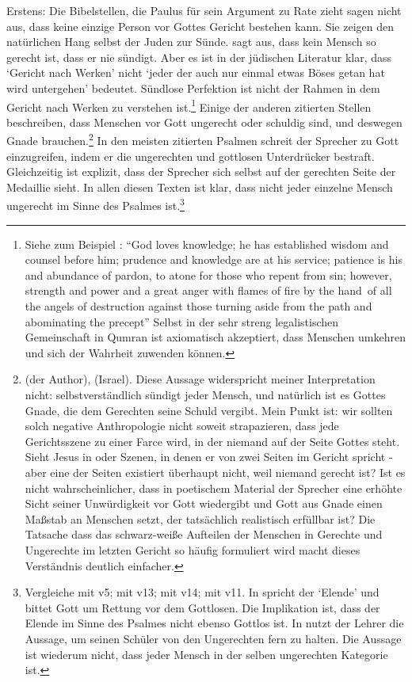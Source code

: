 Erstens: Die Bibelstellen, die Paulus für sein Argument zu Rate zieht sagen nicht aus, dass keine einzige Person vor Gottes Gericht bestehen kann.
Sie zeigen den natürlichen Hang selbst der Juden zur Sünde.
 sagt aus, dass kein Mensch so gerecht ist, dass er nie sündigt.
Aber es ist in der jüdischen Literatur klar, dass `Gericht nach Werken' nicht `jeder der auch nur einmal etwas Böses getan hat wird untergehen' bedeutet.
Sündlose Perfektion ist nicht der Rahmen in dem Gericht nach Werken zu verstehen ist.\footnote{
	Siehe zum Beispiel \Cite[CD-A Col II = 4Q266 2 II]{tdss-se}: ``God loves knowledge; he has established wisdom and counsel
	before him; prudence and knowledge are at his service; patience is his and
	abundance of pardon, to atone for those who repent from sin; however,
	strength and power and a great anger with flames of fire by the \textlangle hand\textrangle\ of all
	the angels of destruction against those turning aside from the path and abominating the precept''
	Selbst in der sehr streng legalistischen Gemeinschaft in Qumran ist axiomatisch akzeptiert, dass Menschen umkehren und sich der Wahrheit zuwenden können.
}
Einige der anderen zitierten Stellen beschreiben, dass Menschen vor Gott ungerecht oder schuldig sind, und deswegen Gnade brauchen.\footnote{
	 (der Author),  (Israel).
	Diese Aussage widerspricht meiner Interpretation nicht: selbstverständlich sündigt jeder Mensch, und natürlich ist es Gottes Gnade,
	die dem Gerechten seine Schuld vergibt.
	Mein Punkt ist: wir sollten solch negative Anthropologie nicht soweit strapazieren, dass jede Gerichtsszene
	zu einer Farce wird, in der niemand auf der Seite Gottes steht.
	Sieht Jesus in  oder  Szenen, in denen er von zwei Seiten im Gericht spricht -
	aber eine der Seiten existiert überhaupt nicht, weil niemand gerecht ist?
	Ist es nicht wahrscheinlicher, dass in poetischem Material der Sprecher eine erhöhte Sicht seiner Unwürdigkeit vor Gott wiedergibt
	und Gott aus Gnade einen Maßstab an Menschen setzt, der tatsächlich realistisch erfüllbar ist?
	Die Tatsache dass das schwarz-weiße Aufteilen der Menschen in Gerechte und Ungerechte im letzten Gericht so häufig formuliert
	wird macht dieses Verständnis deutlich einfacher.
}
In den meisten zitierten Psalmen schreit der Sprecher zu Gott einzugreifen, indem er die ungerechten und gottlosen Unterdrücker bestraft.
Gleichzeitig ist explizit, dass der Sprecher sich selbst auf der gerechten Seite der Medaillie sieht.
In allen diesen Texten ist klar, dass nicht jeder einzelne Mensch ungerecht im Sinne des Psalmes ist.\footnote{
	Vergleiche  mit v5;  mit v13;  mit v14;  mit v11.
	In  spricht der `Elende' und bittet Gott um Rettung vor dem Gottlosen.
	Die Implikation ist, dass der Elende im Sinne des Psalmes
	nicht ebenso Gottlos ist.
	In  nutzt der Lehrer die Aussage, um seinen Schüler von den Ungerechten fern zu halten. Die Aussage ist wiederum nicht,
	dass jeder Mensch in der selben ungerechten Kategorie ist.
}


